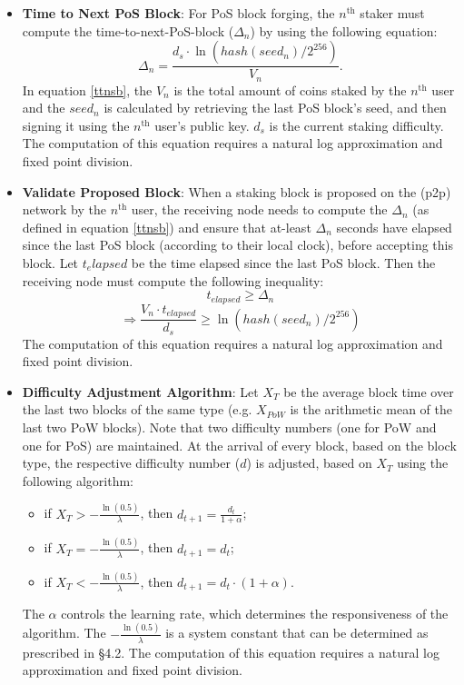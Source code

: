 \begin{itemize}

\item \textbf{Time to Next PoS Block}: For PoS block forging, the $n^{\text{th}}$ staker must compute the time-to-next-PoS-block ($\Delta_n$) by using the following equation:
\begin{equation} \label{ttnsb}
\Delta_n = \frac{d_s \cdot \ln(hash(seed_n)/2^{256})}{V_n}.
\end{equation}
In equation \ref{ttnsb}, the $V_n$ is the total amount of coins staked by the $n^{\text{th}}$ user and the $seed_n$ is calculated by retrieving the last PoS block's seed, and then signing it using the $n^{\text{th}}$ user's public key. $d_s$ is the current staking difficulty. The computation of this equation requires a natural log approximation and fixed point division. 

\item \textbf{Validate Proposed Block}: When a staking block is proposed on the (p2p) network by the $n^{\text{th}}$ user, the receiving node needs to compute the $\Delta_n$ (as defined in equation \ref{ttnsb}) and ensure that at-least $\Delta_n$ seconds have elapsed since the last PoS block (according to their local clock), before accepting this block. Let $t_elapsed$ be the time elapsed since the last PoS block. Then the receiving node must compute the following inequality: 
\begin{equation}
  t_{elapsed} \geq \Delta_n
\end{equation}
\begin{equation} \label{vpb}
  \Rightarrow \frac{V_n \cdot t_{elapsed}}{d_s} \geq \ln(hash(seed_n)/2^{256})
\end{equation}
The computation of this equation requires a natural log approximation and fixed point division.
\item \textbf{Difficulty Adjustment Algorithm}: Let $X_T$ be the average block time over the last two blocks of the same type (e.g. $X_{PoW}$ is the arithmetic mean of the last two PoW blocks). Note that two difficulty numbers (one for PoW and one for PoS) are maintained. At the arrival of every block, based on the block type, the respective difficulty number ($d$) is adjusted, based on $X_T$ using the following algorithm: 
\begin{itemize}
    \item if $X_T > -\frac{\ln (0.5)}{\lambda}$, then $d_{t+1} = \frac{d_t}{1 + \alpha}$;
    \item if $X_T = -\frac{\ln (0.5)}{\lambda}$, then $d_{t+1} = d_t$;
    \item if $X_T < -\frac{\ln (0.5)}{\lambda}$, then $d_{t+1} = d_t \cdot (1 + \alpha)$.
\end{itemize}
The $\alpha$ controls the learning rate, which determines the responsiveness of the algorithm. The $-\frac{\ln (0.5)}{\lambda}$ is a system constant that can be determined as prescribed in \cite{WZS19} \S4.2. The computation of this equation requires a natural log approximation and fixed point division.  
\end{itemize}

